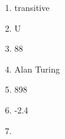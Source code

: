 \documentclass[../uilmath.tex]{subfiles}
\begin{document}
\begin{enumerate}[label=\bfseries\arabic*.]
    \item %
    transitive 

    \item %
    U 

    \item %
    88

    \item %
    Alan Turing 

    \item %
    898

    \item %
    -2.4

    \item %
    
\end{enumerate}
\end{document}
